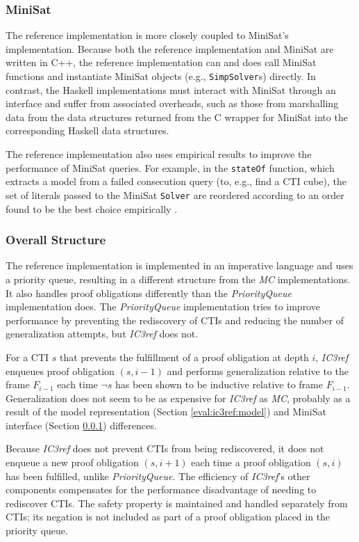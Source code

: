 \documentclass[12pt,a4paper,twoside,openright]{report}
\begin{document}
{{\subsubsection{MiniSat}
\label{eval:ic3ref:minisat}
The reference implementation is more closely coupled to MiniSat's implementation. Because both the reference
implementation and MiniSat are written in C++, the reference implementation can and does call MiniSat functions
and instantiate MiniSat objects (e.g., \verb,SimpSolver,s) directly.
In contrast, the Haskell implementations
must interact with MiniSat through an interface and suffer from associated overheads, such as those from
marshalling data from the data structures returned from the C wrapper for MiniSat into the corresponding
Haskell data structures.

The reference implementation also uses empirical results to improve the performance of MiniSat queries.
For example, in the \verb,stateOf, function, which extracts a model from a failed consecution query
(to, e.g., find a CTI cube), the set of literals passed to the MiniSat \verb,Solver, are reordered according
to an order found to be the best choice empirically \cite{minisat}.

\subsubsection{Overall Structure}

The reference implementation is implemented in an imperative language and
uses a priority queue, resulting in a different structure from the
\emph{MC} implementations. It also handles proof obligations
differently than the \emph{PriorityQueue} implementation does.
The \emph{PriorityQueue} implementation tries to improve performance by
preventing the rediscovery of
CTIs and reducing the number of generalization attempts,
but \emph{IC3ref} does not.

For a CTI $s$ that prevents the fulfillment
of a proof obligation at depth $i$, \emph{IC3ref} enqueues proof
obligation $(s,i - 1)$
and performs generalization relative to the frame $F_{i - 1}$ each time $\neg s$ has been shown
to be inductive relative to frame $F_{i - 1}$. Generalization does not seem
to be as expensive for \emph{IC3ref} as \emph{MC}, probably as a
result of the model representation (Section \ref{eval:ic3ref:model}) and
MiniSat interface (Section \ref{eval:ic3ref:minisat}) differences.

Because \emph{IC3ref} does not prevent CTIs from being rediscovered,
it does not
enqueue a new proof obligation $(s, i+1)$ each time a proof obligation $(s, i)$ has been
fulfilled, unlike \emph{PriorityQueue}.
The efficiency of \emph{IC3ref}'s other components compensates
for the performance disadvantage of needing to rediscover CTIs.
The safety property is maintained and
handled separately from CTIs; its negation is not included as part of a proof obligation
placed in the priority queue.

}}
\end{document}

